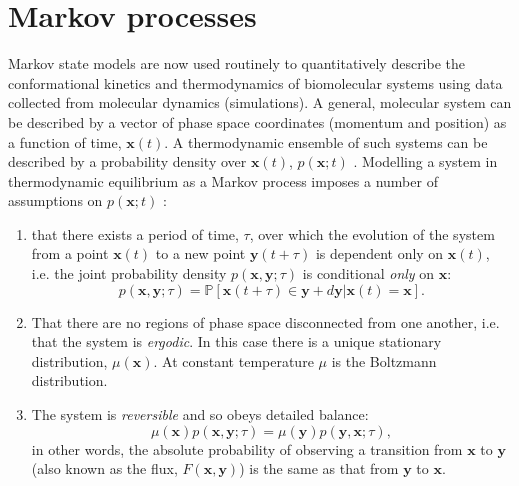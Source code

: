 \section{Markov processes}
Markov state models are now used routinely to quantitatively describe the conformational kinetics and thermodynamics of biomolecular systems using data collected from molecular dynamics (simulations)\cite{wangConstructingMarkovState2018c}\cite{noeMarkovModelsMolecular2019b}. A general, molecular system can be described by a vector of phase space coordinates  (momentum and position) as a function of time, $\mathbf{x}(t)$. A thermodynamic ensemble of such systems can be described by a probability density over $\mathbf{x}(t)$, $p(\mathbf{x}; t)$ \cite{prinzMarkovModelsMolecular2011}. Modelling a system in thermodynamic equilibrium as a Markov process imposes a number of assumptions on $p(\mathbf{x}; t)$ \cite{prinzMarkovModelsMolecular2011}:
\begin{enumerate}
    \item that there exists a period of time, $\tau$, over which the evolution of the system from a point $\mathbf{x}(t)$ to a new point $\mathbf{y}(t+\tau)$ is dependent only on $\mathbf{x}(t)$, i.e. the joint probability density $p(\mathbf{x}, \mathbf{y} ; \tau)$ is conditional \emph{only} on $\mathbf{x}$:
    \begin{equation}\label{eqn:markov_assumption}
    p(\mathbf{x}, \mathbf{y} ; \tau)=\mathbb{P}[\mathbf{x}(t+\tau) \in \mathbf{y}+d \mathbf{y} | \mathbf{x}(t)=\mathbf{x}].
    \end{equation}
    \item That there are no regions of phase space disconnected from one another, i.e. that the system is \emph{ergodic}. In this case there is a unique stationary distribution,  $\mu(\mathbf{x})$. At constant temperature $\mu$ is the Boltzmann distribution. 
    \item The system is \emph{reversible} and so obeys detailed balance: 
    \begin{equation}\label{eqn:detailed_balance}
    \mu(\mathbf{x}) p(\mathbf{x}, \mathbf{y} ; \tau)=\mu(\mathbf{y}) p(\mathbf{y}, \mathbf{x} ; \tau), 
    \end{equation}
    in other words, the absolute probability of observing a transition from $\mathbf{x}$ to $\mathbf{y}$ (also known as the flux, $F(\mathbf{x}, \mathbf{y})$) is the same as that from $\mathbf{y}$ to $\mathbf{x}$. 

\end{enumerate}


